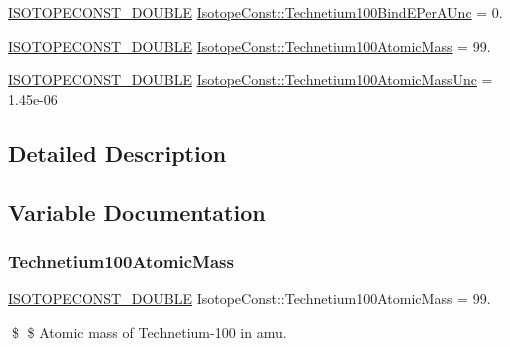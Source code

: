 \begin{DoxyCompactItemize}
\item 
\mbox{\hyperlink{group___isotope_const-_macros_ga8f45a7272ce02c0b4c65c44636ed719a}{I\+S\+O\+T\+O\+P\+E\+C\+O\+N\+S\+T\+\_\+\+D\+O\+U\+B\+LE}} \mbox{\hyperlink{group___isotope_const-_technetium-_tc100_ga909be309c7efa934db7de62ccde4f71a}{Isotope\+Const\+::\+Technetium100\+Bind\+E\+Per\+A\+Unc}} = 0.
\item 
\mbox{\hyperlink{group___isotope_const-_macros_ga8f45a7272ce02c0b4c65c44636ed719a}{I\+S\+O\+T\+O\+P\+E\+C\+O\+N\+S\+T\+\_\+\+D\+O\+U\+B\+LE}} \mbox{\hyperlink{group___isotope_const-_technetium-_tc100_ga67618662ce2e96dee8b8432fab12b502}{Isotope\+Const\+::\+Technetium100\+Atomic\+Mass}} = 99.
\item 
\mbox{\hyperlink{group___isotope_const-_macros_ga8f45a7272ce02c0b4c65c44636ed719a}{I\+S\+O\+T\+O\+P\+E\+C\+O\+N\+S\+T\+\_\+\+D\+O\+U\+B\+LE}} \mbox{\hyperlink{group___isotope_const-_technetium-_tc100_gae62a727a8123d6cc0da5ccdb94562bfd}{Isotope\+Const\+::\+Technetium100\+Atomic\+Mass\+Unc}} = 1.\+45e-\/06
\end{DoxyCompactItemize}


\subsection{Detailed Description}


\subsection{Variable Documentation}
\mbox{\label{group___isotope_const-_technetium-_tc100_ga67618662ce2e96dee8b8432fab12b502}} 
\subsubsection{\texorpdfstring{Technetium100\+Atomic\+Mass}{Technetium100AtomicMass}}
{\footnotesize\ttfamily \mbox{\hyperlink{group___isotope_const-_macros_ga8f45a7272ce02c0b4c65c44636ed719a}{I\+S\+O\+T\+O\+P\+E\+C\+O\+N\+S\+T\+\_\+\+D\+O\+U\+B\+LE}} Isotope\+Const\+::\+Technetium100\+Atomic\+Mass = 99.}

\$ \$ Atomic mass of Technetium-\/100 in amu. \mbox{\label{group___isotope_const-_technetium-_tc100_gae62a727a8123d6cc0da5ccdb94562bfd}} 
